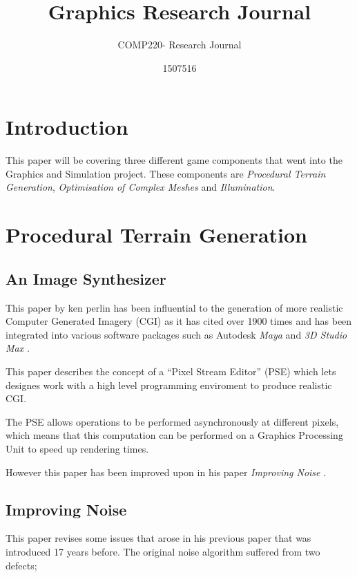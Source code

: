 \documentclass{scrartcl}
\title{Graphics Research Journal}
\subtitle{COMP220- Research Journal}
\author{1507516}
\begin{document}
\maketitle

\abstract{}

\section{Introduction}
This paper will be covering three different game components that went into the Graphics and Simulation project. 
These components are \textit{Procedural Terrain Generation}, \textit{Optimisation of Complex Meshes} and \textit{Illumination}.




\section{Procedural Terrain Generation}

\subsection{An Image Synthesizer \cite{perlin1985image}}
\par

This paper by ken perlin has been influential to the generation of more realistic Computer Generated Imagery (CGI) as it has cited over 1900 times and has been integrated into various software packages such as Autodesk \textit{Maya} and \textit{3D Studio Max} \cite{PerlinWebsite}.
\par

This paper describes the concept of a ``Pixel Stream Editor'' (PSE) which lets designes work with a high level programming enviroment to produce realistic CGI.

The PSE allows operations to be performed asynchronously at different pixels, which means that this computation can be performed on a Graphics Processing Unit to speed up rendering times.

However this paper has been improved upon in his paper \textit{Improving Noise} \cite{perlin2002improving}.


\subsection{Improving Noise \cite{perlin2002improving}}
This paper revises some issues that arose in his previous paper that was introduced 17 years before. 
The original noise algorithm suffered from two defects; 
\end{document}
